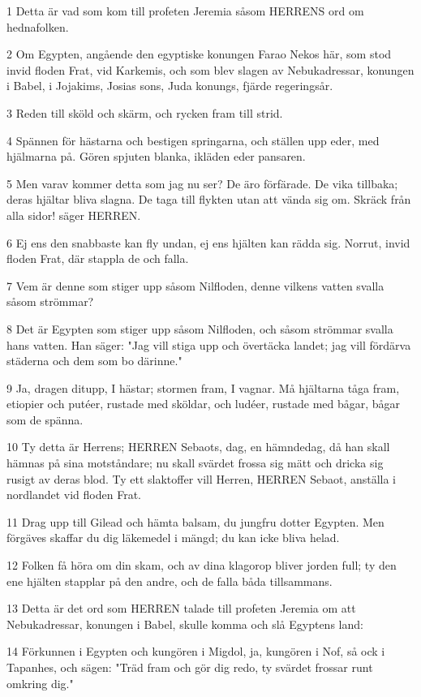 \par 1 Detta är vad som kom till profeten Jeremia såsom HERRENS ord om hednafolken.
\par 2 Om Egypten, angående den egyptiske konungen Farao Nekos här, som stod invid floden Frat, vid Karkemis, och som blev slagen av Nebukadressar, konungen i Babel, i Jojakims, Josias sons, Juda konungs, fjärde regeringsår.
\par 3 Reden till sköld och skärm, och rycken fram till strid.
\par 4 Spännen för hästarna och bestigen springarna, och ställen upp eder, med hjälmarna på. Gören spjuten blanka, ikläden eder pansaren.
\par 5 Men varav kommer detta som jag nu ser? De äro förfärade. De vika tillbaka; deras hjältar bliva slagna. De taga till flykten utan att vända sig om. Skräck från alla sidor! säger HERREN.
\par 6 Ej ens den snabbaste kan fly undan, ej ens hjälten kan rädda sig. Norrut, invid floden Frat, där stappla de och falla.
\par 7 Vem är denne som stiger upp såsom Nilfloden, denne vilkens vatten svalla såsom strömmar?
\par 8 Det är Egypten som stiger upp såsom Nilfloden, och såsom strömmar svalla hans vatten. Han säger: "Jag vill stiga upp och övertäcka landet; jag vill fördärva städerna och dem som bo därinne."
\par 9 Ja, dragen ditupp, I hästar; stormen fram, I vagnar. Må hjältarna tåga fram, etiopier och putéer, rustade med sköldar, och ludéer, rustade med bågar, bågar som de spänna.
\par 10 Ty detta är Herrens; HERREN Sebaots, dag, en hämndedag, då han skall hämnas på sina motståndare; nu skall svärdet frossa sig mätt och dricka sig rusigt av deras blod. Ty ett slaktoffer vill Herren, HERREN Sebaot, anställa i nordlandet vid floden Frat.
\par 11 Drag upp till Gilead och hämta balsam, du jungfru dotter Egypten. Men förgäves skaffar du dig läkemedel i mängd; du kan icke bliva helad.
\par 12 Folken få höra om din skam, och av dina klagorop bliver jorden full; ty den ene hjälten stapplar på den andre, och de falla båda tillsammans.
\par 13 Detta är det ord som HERREN talade till profeten Jeremia om att Nebukadressar, konungen i Babel, skulle komma och slå Egyptens land:
\par 14 Förkunnen i Egypten och kungören i Migdol, ja, kungören i Nof, så ock i Tapanhes, och sägen: "Träd fram och gör dig redo, ty svärdet frossar runt omkring dig."
